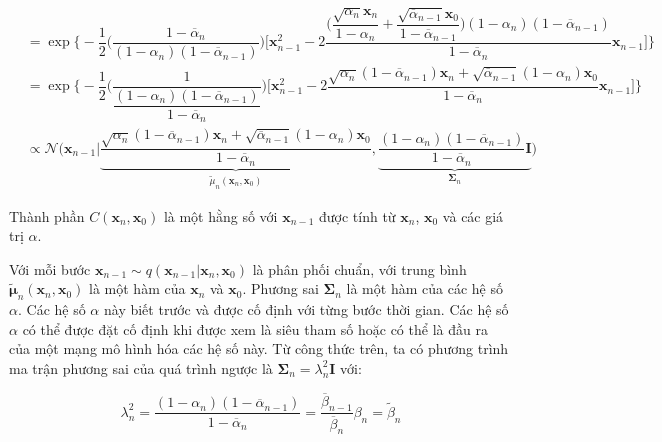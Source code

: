 \documentclass[14pt, a4paper]{article}
\numberwithin{equation}{section}
\numberwithin{figure}{section}
\numberwithin{dl}{section}
\numberwithin{md}{section}
\numberwithin{bd}{section}
\numberwithin{dn}{section}
\numberwithin{hq}{section}
\begin{document}
\begin{equation*}
\begin{aligned}
            &= \exp \Biggl \lbrace - \dfrac{1}{2} \Big( \dfrac{1 - \overline{\alpha}_n}{(1 - \alpha_n)(1 - \overline{\alpha}_{n-1})} \Big) \Bigg \lbrack \boldsymbol{x}_{n-1}^2 - 2 \dfrac{\Big( \dfrac{\sqrt{\alpha_n}\boldsymbol{x}_n}{1 - \alpha_n} + \dfrac{\sqrt{\overline{\alpha}_{n-1}} \boldsymbol{x}_0}{1 - \overline{\alpha}_{n-1}} \Big)(1 - \alpha_n)(1 - \overline{\alpha}_{n-1})}{1 - \overline{\alpha}_n} \boldsymbol{x}_{n-1} \Bigg \rbrack \Biggl \rbrace \\
            &= \exp \Biggl \lbrace - \dfrac{1}{2} \Bigg( \dfrac{1}{\dfrac{(1 - \alpha_n)(1 - \overline{\alpha}_{n-1})}{1 - \overline{\alpha}_n}} \Bigg) \Bigg \lbrack \boldsymbol{x}_{n-1}^2 - 2 \dfrac{\sqrt{\alpha_n}(1 - \overline{\alpha}_{n-1})\boldsymbol{x}_n + \sqrt{\overline{\alpha}_{n-1}}(1 - \alpha_n) \boldsymbol{x}_0}{1 - \overline{\alpha}_n} \boldsymbol{x}_{n-1} \Bigg \rbrack \Biggl \rbrace \\
            & \propto \mathcal{N} \Bigg( \boldsymbol{x}_{n-1} \vert \underbrace{\dfrac{\sqrt{\alpha_n}(1 - \overline{\alpha}_{n-1})\boldsymbol{x}_n + \sqrt{\overline{\alpha}_{n-1}}(1 - \alpha_n) \boldsymbol{x}_0}{1 - \overline{\alpha}_n}}_{\tilde{\mu}_n (\boldsymbol{x}_n, \boldsymbol{x}_0)}, \underbrace{\dfrac{(1 - \alpha_n)(1 - \overline{\alpha}_{n-1})}{1 - \overline{\alpha}_n} \boldsymbol{I}}_{\boldsymbol{\Sigma}_n} \Bigg)
        \end{aligned}
    \end{equation*}

    Thành phần $C(\boldsymbol{x}_n, \boldsymbol{x}_0)$ là một hằng số với $\boldsymbol{x}_{n-1}$ được tính từ $\boldsymbol{x}_n$, $\boldsymbol{x}_0$ và các giá trị $\alpha$.

    Với mỗi bước $\boldsymbol{x}_{n-1} \sim q(\boldsymbol{x}_{n-1} \vert \boldsymbol{x}_n, \boldsymbol{x}_0)$ là phân phối chuẩn, với trung bình $\tilde{\boldsymbol{\mu}}_n (\boldsymbol{x}_n, \boldsymbol{x}_0)$ là một hàm của $\boldsymbol{x}_n$ và $\boldsymbol{x}_0$.
    Phương sai $\boldsymbol{\Sigma}_n$ là một hàm của các hệ số $\alpha$.
    Các hệ số $\alpha$ này biết trước và được cố định với từng bước thời gian.
    Các hệ số $\alpha$ có thể được đặt cố định khi được xem là siêu tham số hoặc có thể là đầu ra của một mạng mô hình hóa các hệ số này.
    Từ công thức trên, ta có phương trình ma trận phương sai của quá trình ngược là $\boldsymbol{\Sigma}_n = \lambda_n^2 \boldsymbol{I}$ với:

    \begin{equation}
        \lambda_n^2 = \dfrac{(1 - \alpha_n)(1 - \overline{\alpha}_{n-1})}{1 - \overline{\alpha}_n} = \dfrac{\overline{\beta}_{n-1}}{\overline{\beta}_n} \beta_n = \tilde{\beta}_n
    \end{equation}
\end{document}
